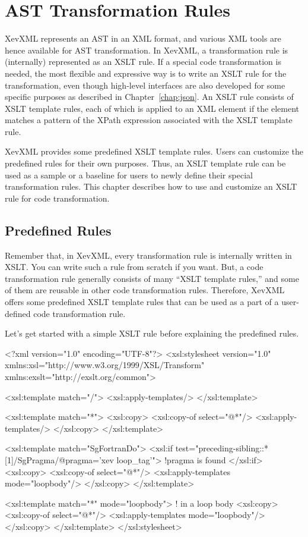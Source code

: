 \chapter{AST Transformation Rules}\label{chap:xslt}

XevXML represents an AST in an XML format, and various XML tools are
hence available for AST transformation. In XevXML, a transformation rule
is (internally) represented as an XSLT rule. If a special code
transformation is needed, the most flexible and expressive way is to
write an XSLT rule for the transformation, even though high-level
interfaces are also developed for some specific purposes as described in
Chapter~\ref{chap:json}. An XSLT rule consists of XSLT template rules,
each of which is applied to an XML element if the element matches a
pattern of the XPath expression associated with the XSLT template rule.

XevXML provides some predefined XSLT template rules.  Users can
customize the predefined rules for their own purposes.  Thus, an XSLT
template rule can be used as a sample or a baseline for users to newly
define their special transformation rules.  This chapter describes how
to use and customize an XSLT rule for code transformation.


\section{Predefined Rules}\label{sec:predef}
Remember that, in XevXML, every transformation rule is internally
written in XSLT. You can write such a rule from scratch if you want.
But, a code transformation rule generally consists of many ``XSLT
template rules,'' and some of them are reusable in other code
transformation rules.  Therefore, XevXML offers some predefined XSLT
template rules that can be used as a part of a user-defined code
transformation rule.

Let's get started with a simple XSLT rule before explaining the
predefined rules.
\begin{framed}
\begin{src}
<?xml version="1.0" encoding="UTF-8"?>
<xsl:stylesheet version="1.0"
   xmlns:xsl="http://www.w3.org/1999/XSL/Transform"
   xmlns:exslt="http://exslt.org/common">

  <xsl:template match="/">
    <xsl:apply-templates/>
  </xsl:template>

  <xsl:template match="*">
    <xsl:copy>
      <xsl:copy-of select="@*"/>
      <xsl:apply-templates/>
    </xsl:copy>
  </xsl:template>

  <xsl:template match="SgFortranDo">
    <xsl:if test="preceding-sibling::*[1]/SgPragma/@pragma='xev loop_tag'">
      !pragma is found
    </xsl:if>
    <xsl:copy>
      <xsl:copy-of select="@*"/>
      <xsl:apply-templates mode="loopbody"/>
    </xsl:copy>
  </xsl:template>

  <xsl:template match="*" mode="loopbody">
    ! in a loop body
    <xsl:copy>
      <xsl:copy-of select="@*"/>
      <xsl:apply-templates mode="loopbody"/>
    </xsl:copy>
  </xsl:template>
</xsl:stylesheet>
\end{src}
\end{framed}

